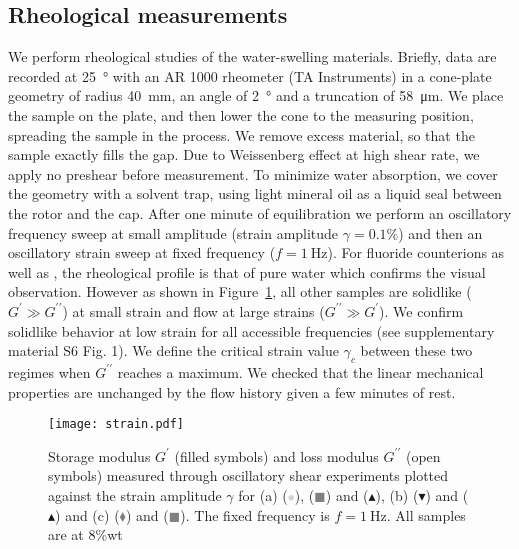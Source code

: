\documentclass[journal=jacsat,manuscript=article]{achemso}
\begin{document}
\subsection{Rheological measurements}
We perform rheological studies of the water-swelling materials. Briefly, data are recorded at \SI{25}{\degree} with an AR 1000 rheometer (TA Instruments) in a cone-plate geometry of radius \SI{40}{\milli\metre}, an angle of \SI{2}{\degree} and a truncation of \SI{58}{\micro\metre}\cite{Macosko1994,Larson1999}. We place the sample on the plate, and then lower the cone to the measuring position, spreading the sample in the process. We remove excess material, so that the sample exactly fills the gap. Due to Weissenberg effect at high shear rate, we apply no preshear before measurement. To minimize water absorption, we cover the geometry with a solvent trap, using light mineral oil as a liquid seal between the rotor and the cap. After one minute of equilibration we perform an oscillatory frequency sweep at small amplitude (strain amplitude $\gamma=0.1\%$) and then an oscillatory strain sweep at fixed frequency ($f=\SI{1}{\hertz}$). For fluoride counterions as well as , the rheological profile is that of pure water which confirms the visual observation. However as shown in Figure~\ref{fig:strain}, all other samples are solidlike ($G^\prime \gg G^{\prime\prime}$) at small strain and flow at large strains ($G^{\prime\prime} \gg G^\prime$). We confirm solidlike behavior at low strain for all accessible frequencies (see supplementary material S6 Fig. 1). We define the critical strain value $\gamma_c$ between these two regimes when $G^{\prime\prime}$ reaches a maximum. We checked that the linear mechanical properties are unchanged by the flow history given a few minutes of rest. %

\begin{figure}
\texttt{[image: strain.pdf]}
\caption{Storage modulus $G^\prime$ (filled symbols) and loss modulus $G^{\prime\prime}$ (open symbols) measured through oscillatory shear experiments plotted against the strain amplitude $\gamma$ for (a)  (\textcolor{lightgray}{$\bullet$}),  (\textcolor{gray}{$\blacksquare$}) and  ($\blacktriangle$), (b)  ($\blacktriangledown$) and  ($\blacktriangle$) and (c)  (\textcolor{gray}{$\blacklozenge$}) and  (\textcolor{gray}{$\blacksquare$}). The fixed frequency is $f=\SI{1}{\hertz}$. All samples are at 8\%wt }
\label{fig:strain}
\end{figure}
\end{document}
